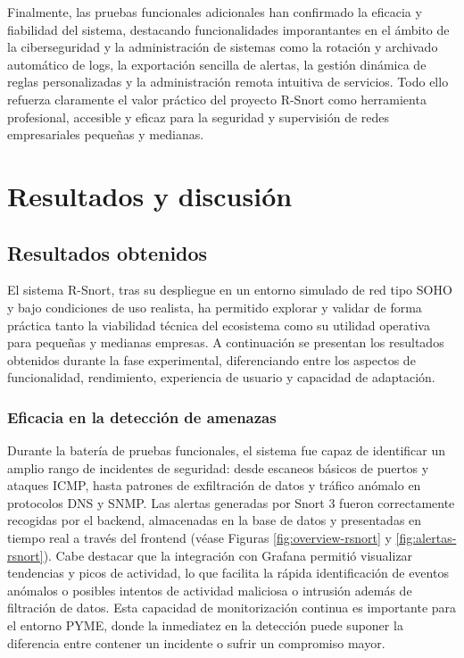 \documentclass[11pt,a4paper,twoside]{report}
\begin{document}
Finalmente, las pruebas funcionales adicionales han confirmado la eficacia y fiabilidad del sistema, destacando funcionalidades imporantantes en el ámbito de la ciberseguridad y la administración de sistemas como la rotación y archivado automático de logs, la exportación sencilla de alertas, la gestión dinámica de reglas personalizadas y la administración remota intuitiva de servicios. Todo ello refuerza claramente el valor práctico del proyecto R-Snort como herramienta profesional, accesible y eficaz para la seguridad y supervisión de redes empresariales pequeñas y medianas.






\clearpage
\null
\thispagestyle{empty}
\newpage
\chapter{Resultados y discusión}

\section{Resultados obtenidos}

El sistema R-Snort, tras su despliegue en un entorno simulado de red tipo SOHO y bajo condiciones de uso realista, ha permitido explorar y validar de forma práctica tanto la viabilidad técnica del ecosistema como su utilidad operativa para pequeñas y medianas empresas. A continuación se presentan los resultados obtenidos durante la fase experimental, diferenciando entre los aspectos de funcionalidad, rendimiento, experiencia de usuario y capacidad de adaptación.

\subsection{Eficacia en la detección de amenazas}

Durante la batería de pruebas funcionales, el sistema fue capaz de identificar un amplio rango de incidentes de seguridad: desde escaneos básicos de puertos y ataques ICMP, hasta patrones de exfiltración de datos y tráfico anómalo en protocolos DNS y SNMP. Las alertas generadas por Snort 3 fueron correctamente recogidas por el backend, almacenadas en la base de datos y presentadas en tiempo real a través del frontend (véase Figuras \ref{fig:overview-rsnort} y \ref{fig:alertas-rsnort}). Cabe destacar que la integración con Grafana permitió visualizar tendencias y picos de actividad, lo que facilita la rápida identificación de eventos anómalos o posibles intentos de actividad maliciosa o intrusión además de filtración de datos. Esta capacidad de monitorización continua es importante para el entorno PYME, donde la inmediatez en la detección puede suponer la diferencia entre contener un incidente o sufrir un compromiso mayor.\newline
\end{document}
